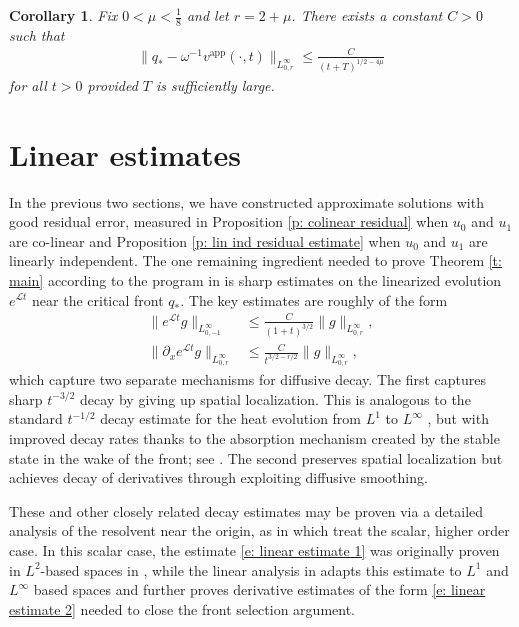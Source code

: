 \documentclass[11pt]{article}
\newcommand{\mcl}{\mathcal{L}}
\newtheorem{corollary}[prop]{Corollary}
\numberwithin{equation}{section}
\numberwithin{prop}{section}
\newcommand{\vapp}{v^\mathrm{app}}
\begin{document}
\begin{corollary}\label{c: lin ind front approximated by vapp}
	Fix $0 < \mu < \frac{1}{8}$ and let $r = 2 + \mu$. There exists a constant $C>0$ such that
	\begin{align}
	\| q_* - \omega^{-1} \vapp(\cdot, t) \|_{L^\infty_{0, r}} \leq \frac{C}{(t+T)^{1/2-4\mu}}
	\end{align}
	for all $t>0$ provided $T$ is sufficiently large. 
\end{corollary}


\section{Linear estimates}\label{s: linear estimates}
In the previous two sections, we have constructed approximate solutions with good residual error, measured in Proposition \ref{p: colinear residual} when $u_0$ and $u_1$ are co-linear and Proposition \ref{p: lin ind residual estimate} when $u_0$ and $u_1$ are linearly independent. The one remaining ingredient needed to prove Theorem \ref{t: main} according to the program in \cite{CAMS} is sharp estimates on the linearized evolution $e^{\mcl t}$ near the critical front $q_*$. The key estimates are roughly of the form
\begin{align}
\| e^{\mcl t} g \|_{L^\infty_{0,-1}} &\leq \frac{C}{(1+t)^{3/2}} \| g \|_{L^\infty_{0, r}}, \label{e: linear estimate 1} \\
\| \partial_x e^{\mcl t} g \|_{L^\infty_{0,r}} &\leq \frac{C}{t^{3/2-r/2}} \| g\|_{L^\infty_{0,r}}, \label{e: linear estimate 2}
\end{align}
which capture two separate mechanisms for diffusive decay. The first captures sharp $t^{-3/2}$ decay by giving up spatial localization. This is analogous to the standard $t^{-1/2}$ decay estimate for the heat evolution from $L^1$ to $L^\infty$ , but with improved decay rates thanks to the absorption mechanism created by the stable state in the wake of the front; see \cite{SIMA}. The second preserves spatial localization but achieves decay of derivatives through exploiting diffusive smoothing. 

These and other closely related decay estimates may be proven via a detailed analysis of the resolvent near the origin, as in \cite{SIMA, CAMS} which treat the scalar, higher order case. In this scalar case, the estimate \eqref{e: linear estimate 1} was originally proven in $L^2$-based spaces in \cite{SIMA}, while the linear analysis in \cite{CAMS} adapts this estimate to $L^1$ and $L^\infty$ based spaces and further proves derivative estimates of the form \eqref{e: linear estimate 2} needed to close the front selection argument. 
\end{document}
